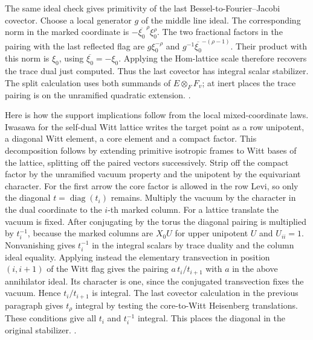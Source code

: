 The same ideal check gives primitivity of the last
Bessel-to-Fourier--Jacobi covector. Choose a local
generator \(g\) of the middle line ideal. The corresponding
norm in the marked coordinate is
\(-\overline{\xi_0}^{\,\rho}\xi_0^\rho\).
The two fractional factors in the pairing with the last
reflected flag are \(g\xi_0^{-\rho}\) and
\(g^{-1}\overline{\xi_0}^{-(\rho-1)}\). Their product
with this norm is \(\xi_0\), using
\(\overline{\xi_0}=-\xi_0\). Applying the Hom-lattice scale
therefore recovers the trace dual just computed. Thus the
last covector has integral scalar stabilizer. The split
calculation uses both summands of \(E\otimes_F F_v\);
at inert places the trace pairing is on the unramified
quadratic extension.
.

Here is how the support implications follow from the
local mixed-coordinate laws. Iwasawa for the self-dual
Witt lattice writes the target point as a row unipotent,
a diagonal Witt element, a core element and a compact
factor. This decomposition follows by extending primitive
isotropic frames to Witt bases of the lattice, splitting
off the paired vectors successively. Strip off the compact
factor by the unramified vacuum property and the unipotent
by the equivariant character. For the first arrow the core
factor is allowed in the row Levi, so only the diagonal
\(t=\operatorname{diag}(t_i)\) remains. Multiply the vacuum
by the character in the dual coordinate to the \(i\)-th marked
column. For a lattice translate the vacuum is fixed. After
conjugating by the torus the diagonal pairing is multiplied by
\(t_i^{-1}\), because the marked columns are \(X_0U\) for
upper unipotent \(U\) and \(U_{ii}=1\). Nonvanishing gives
\(t_i^{-1}\) in the integral scalars by trace duality and the
column ideal equality. Applying instead the elementary
transvection in position \((i,i+1)\) of the Witt flag gives
the pairing \(a\,t_i/t_{i+1}\) with \(a\) in the above
annihilator ideal. Its character is one, since the conjugated
transvection fixes the vacuum. Hence \(t_i/t_{i+1}\) is integral.
The last covector calculation in the previous paragraph
gives \(t_\rho\) integral by testing the core-to-Witt
Heisenberg translations. These conditions give all \(t_i\)
and \(t_i^{-1}\) integral. This places the diagonal in
the original stabilizer.
.

